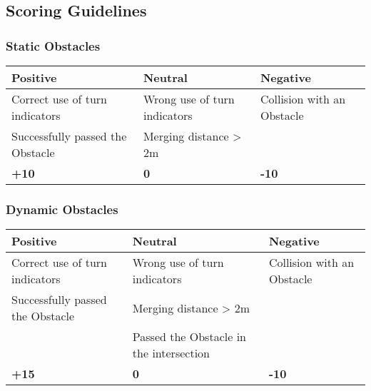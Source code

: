 {	\newpage

	\subsection{Scoring Guidelines}
	\label{obstacle_scoring_guidelines}

	\subsubsection*{Static Obstacles}
	\begin{table}[H]
		\begin{tabularx}{\textwidth}{XXX}
			\toprule
			\textbf{Positive}                & \textbf{Neutral}             & \textbf{Negative}          \\
			\midrule
			Correct use of turn indicators   & Wrong use of turn indicators & Collision with an Obstacle \\
			Successfully passed the Obstacle & Merging distance > 2m        &                            \\
			\topstrut
			\textbf{+10}                     & \textbf{0}                   & \textbf{-10}               \\
			\bottomrule
		\end{tabularx}
	\end{table}

	\subsubsection*{Dynamic Obstacles}
	\begin{table}[H]
		\begin{tabularx}{\textwidth}{XXX}
			\toprule
			\textbf{Positive}                & \textbf{Neutral}                        & \textbf{Negative}          \\
			\midrule
			Correct use of turn indicators   & Wrong use of turn indicators            & Collision with an Obstacle \\
			Successfully passed the Obstacle & Merging distance > 2m                   &                            \\
			                                 & Passed the Obstacle in the intersection &                            \\
			\topstrut
			\textbf{+15}                     & \textbf{0}                              & \textbf{-10}               \\
			\bottomrule
		\end{tabularx}
	\end{table}

}
